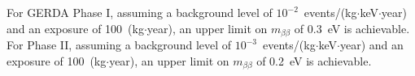 For GERDA Phase I, assuming a background level of $10^{-2}$~events/(kg$\cdot$keV$\cdot$year) and an exposure of 100~(kg$\cdot$year), an upper limit on $m_{\beta\beta}$ of 0.3~eV is achievable. For Phase II, assuming a background level of $10^{-3}$~events/(kg$\cdot$keV$\cdot$year) and an exposure of 100~(kg$\cdot$year), an upper limit on $m_{\beta\beta}$ of 0.2~eV is achievable.

